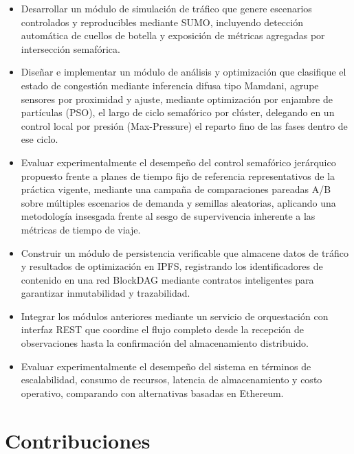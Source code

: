 \begin{itemize}
    \item Desarrollar un módulo de simulación de tráfico que genere escenarios controlados
          y reproducibles mediante SUMO, incluyendo detección automática de cuellos de botella
          y exposición de métricas agregadas por intersección semafórica.

    \item Diseñar e implementar un módulo de análisis y optimización que clasifique el estado
          de congestión mediante inferencia difusa tipo Mamdani, agrupe sensores por
          proximidad y ajuste, mediante optimización por enjambre de partículas (PSO), el
          largo de ciclo semafórico por clúster, delegando en un control local por presión
          (Max-Pressure) el reparto fino de las fases dentro de ese ciclo.

    \item Evaluar experimentalmente el desempeño del control semafórico jerárquico propuesto
          frente a planes de tiempo fijo de referencia representativos de la práctica vigente,
          mediante una campaña de comparaciones pareadas A/B sobre múltiples escenarios de
          demanda y semillas aleatorias, aplicando una metodología insesgada frente al sesgo
          de supervivencia inherente a las métricas de tiempo de viaje.

    \item Construir un módulo de persistencia verificable que almacene datos de tráfico y
          resultados de optimización en IPFS, registrando los identificadores de contenido en
          una red BlockDAG mediante contratos inteligentes para garantizar inmutabilidad y
          trazabilidad.

    \item Integrar los módulos anteriores mediante un servicio de orquestación con interfaz
          REST que coordine el flujo completo desde la recepción de observaciones hasta la
          confirmación del almacenamiento distribuido.

    \item Evaluar experimentalmente el desempeño del sistema en términos de escalabilidad,
          consumo de recursos, latencia de almacenamiento y costo operativo, comparando con
          alternativas basadas en Ethereum.
\end{itemize}

\section{Contribuciones}

